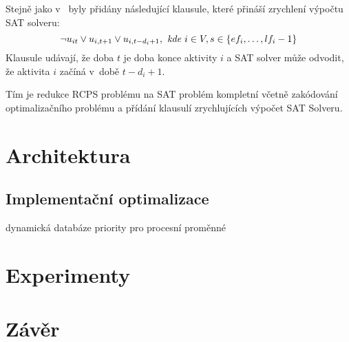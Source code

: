 \documentclass[a4paper, 12pt]{article}
\begin{document}
Stejně jako v~\cite{horbach:10} byly přidány následující klausule, které přináší zrychlení výpočtu SAT solveru:
\begin{equation}
\label{eq:6}
   \neg u_{it} \vee u_{i,t+1} \vee u_{i,t-d_i+1},\emph{ kde } i\in V, s\in\{ef_i,\ldots,lf_i-1\}  
\end{equation}
Klausule udávají, že doba $t$ je doba konce aktivity $i$ a SAT solver může odvodit, že aktivita $i$ začíná v~době
$t-d_i+1$.

Tím je redukce RCPS problému na SAT problém kompletní včetně zakódování optimalizačního problému a přídání
klausulí zrychlujících výpočet SAT Solveru.

\section{Architektura}
\label{sec:arch}

\subsection{Implementační optimalizace}
dynamická databáze
priority pro procesní proměnné

\section{Experimenty}

\section{Závěr}

\newpage


\end{document}

